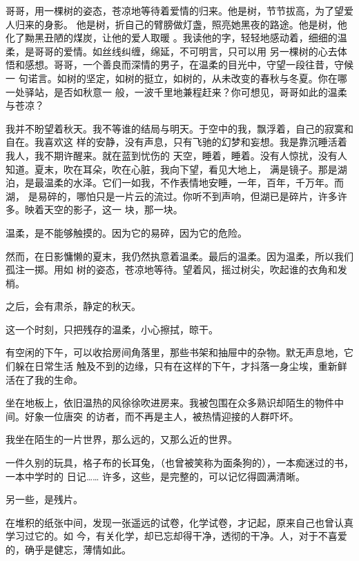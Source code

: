 \documentclass[12pt,a4paper]{article}
\def\blankrev{\vspace{1ex}}									%
\begin{document}
		哥哥，用一棵树的姿态，苍凉地等待着爱情的归来。他是树，节节拔高，为了望爱人归来的身影。
	他是树，折自己的臂膀做灯盏，照亮她黑夜的路途。他是树，他化了黝黑丑陋的煤炭，让他的爱人取暖
	。我读他的字，轻轻地感动着，细细的温柔，是哥哥的爱情。如丝线纠缠，绵延，不可明言，只可以用
	另一棵树的心去体悟和感想。哥哥，一个善良而深情的男子，在温柔的目光中，守望一段往昔，守候一
	句诺言。如树的坚定，如树的挺立，如树的，从未改变的春秋与冬夏。你在哪一处驿站，是否如秋意一
	般，一波千里地兼程赶来？你可想见，哥哥如此的温柔与苍凉？

		我并不盼望着秋天。我不等谁的结局与明天。于空中的我，飘浮着，自己的寂寞和自在。我喜欢这
	样的安静，没有声息，只有飞驰的幻梦和妄想。我是靠沉睡活着我人，我不期许醒来。就在蓝到忧伤的
	天空，睡着，睡着。没有人惊扰，没有人知道。夏末，吹在耳朵，吹在心脏，我向下望，看见大地上，
	满是镜子。那是湖泊，是最温柔的水泽。它们一如我，不作表情地安睡，一年，百年，千万年。而湖，
	是易碎的，哪怕只是一片云的流过。你听不到声响，但湖已是碎片，许多许多。映着天空的影子，这一
	块，那一块。


		\blankrev
		温柔，是不能够触摸的。因为它的易碎，因为它的危险。

		然而，在日影慵懒的夏末，我仍然执意着温柔。最后的温柔。因为温柔，所以我们孤注一掷。用如
	树的姿态，苍凉地等待。望着风，摇过树尖，吹起谁的衣角和发梢。

		\blankrev
		之后，会有肃杀，静定的秋天。

		这一个时刻，只把残存的温柔，小心擦拭，晾干。

	\endwriting



		有空闲的下午，可以收拾房间角落里，那些书架和抽屉中的杂物。默无声息地，它们躲在日常生活
	触及不到的边缘，只有在这样的下午，才抖落一身尘埃，重新鲜活在了我的生命。

		坐在地板上，依旧温热的风徐徐吹进房来。我被包围在众多熟识却陌生的物件中间。好象一位唐突
	的访者，而不再是主人，被热情迎接的人群吓坏。

		我坐在陌生的一片世界，那么远的，又那么近的世界。

		一件久别的玩具，格子布的长耳兔，（也曾被笑称为面条狗的），一本痴迷过的书，一本中学时的
	日记…… 许多，这些，是完整的，可以记忆得圆满清晰。

		另一些，是残片。

		在堆积的纸张中间，发现一张遥远的试卷，化学试卷，才记起，原来自己也曾认真学习过它的。如
	今，有关化学，却已忘却得干净，透彻的干净。人，对于不喜爱的，确乎是健忘，薄情如此。
\end{document}
